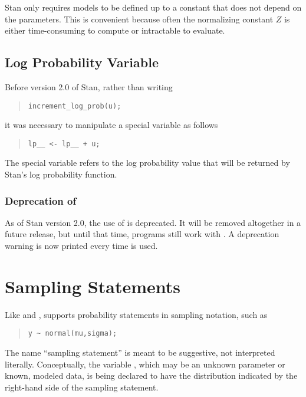 Stan only requires models to be defined up to a constant that does not
depend on the parameters.  This is convenient because often the
normalizing constant $Z$ is either time-consuming to compute or
intractable to evaluate.

\subsection{Log Probability Variable }

Before version 2.0 of Stan, rather than writing
%
\begin{quote}
\begin{Verbatim}
increment_log_prob(u);
\end{Verbatim}
\end{quote}
%
it was necessary to manipulate a special variable 
as follows
%
\begin{quote}
\begin{Verbatim}
lp__ <- lp__ + u;
\end{Verbatim}
\end{quote}
%
The special variable  refers to the log probability value
that will be returned by Stan's log probability function.  

\subsubsection{Deprecation of }

As of Stan version 2.0, the use of  is deprecated.  It
will be removed altogether in a future release, but until that time,
programs still work with .  A deprecation warning is now
printed every time  is used.


\section{Sampling Statements}

Like \BUGS and \JAGS, \Stan supports probability statements in
sampling notation, such as
%
\begin{quote}
\begin{Verbatim}[fontsize=\small]
y ~ normal(mu,sigma);
\end{Verbatim}
\end{quote}
%
The name ``sampling statement'' is meant to be suggestive, not
interpreted literally.  Conceptually, the variable , which may
be an unknown parameter or known, modeled data, is being declared
to have the distribution indicated by the right-hand side of the
sampling statement.

